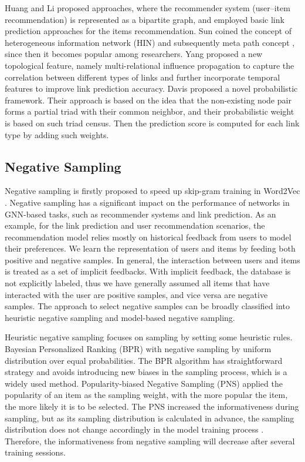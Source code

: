 Huang \etal \cite{chen2005link} and Li \etal \cite{li2014recommendation} proposed approaches, where the recommender system (user–item recommendation) is represented as a bipartite graph, and employed basic link prediction approaches for the items recommendation. Sun \etal \cite{sun2009rankclus, sun2009ranking} coined the concept of heterogeneous information network (HIN) and subsequently meta path concept \cite{sun2011pathsim}, since then it becomes popular among researchers. Yang \etal \cite{yang2012predicting} proposed a new topological feature, namely multi-relational influence propagation to capture the correlation between different types of links and further incorporate temporal features to improve link prediction accuracy. Davis \etal \cite{davis2011multi} proposed a novel probabilistic framework. Their approach is based on the idea that the non-existing node pair forms a partial triad with their common neighbor, and their probabilistic weight is based on such triad census. Then the prediction score is computed for each link type by adding such weights.


\subsection{Negative Sampling}
Negative sampling is firstly proposed to speed up skip-gram training in Word2Vec \cite{word2vec}. Negative sampling has a significant impact on the performance of networks in GNN-based tasks, such as recommender systems and link prediction. As an example, for the link prediction and user recommendation scenarios, the recommendation model relies mostly on historical feedback from users to model their preferences. We learn the representation of users and items by feeding both positive and negative samples. In general, the interaction between users and items is treated as a set of implicit feedbacks. With implicit feedback, the database is not explicitly labeled, thus we have generally assumed all items that have interacted with the user are positive samples, and vice versa are negative samples. The approach to select negative samples can be broadly classified into heuristic negative sampling and model-based negative sampling.

Heuristic negative sampling focuses on sampling by setting some heuristic rules. Bayesian Personalized Ranking (BPR) \cite{rendle2012bpr} with negative sampling by uniform distribution over equal probabilities. The BPR algorithm has straightforward strategy and avoids introducing new biases in the sampling process, which is a widely used method. Popularity-biased Negative Sampling (PNS) \cite{chen2017sampling} applied the popularity of an item as the sampling weight, with the more popular the item, the more likely it is to be selected. The PNS increased the informativeness during sampling, but as its sampling distribution is calculated in advance, the sampling distribution does not change accordingly in the model training process \cite{rendle2014improving}. Therefore, the informativeness from negative sampling will decrease after several training sessions.

